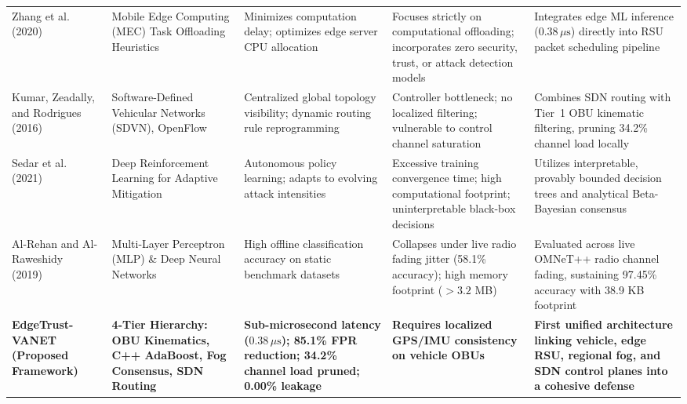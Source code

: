 \documentclass[conference]{IEEEtran}
\begin{document}
\begin{table}[t]
{\begin{tabular}{p{3.2cm}p{3.0cm}p{2.8cm}p{3.4cm}p{4.2cm}}
\addlinespace
Zhang et al.~\cite{fogvanet} (2020) & Mobile Edge Computing (MEC) Task Offloading Heuristics & Minimizes computation delay; optimizes edge server CPU allocation & Focuses strictly on computational offloading; incorporates zero security, trust, or attack detection models & Integrates edge ML inference ($0.38\,\mu\text{s}$) directly into RSU packet scheduling pipeline \\
\addlinespace
Kumar, Zeadally, and Rodrigues~\cite{sdnvanet} (2016) & Software-Defined Vehicular Networks (SDVN), OpenFlow & Centralized global topology visibility; dynamic routing rule reprogramming & Controller bottleneck; no localized filtering; vulnerable to control channel saturation & Combines SDN routing with Tier~1 OBU kinematic filtering, pruning 34.2\% channel load locally \\
\addlinespace
Sedar et al.~\cite{sedar2020reinforcement} (2021) & Deep Reinforcement Learning for Adaptive Mitigation & Autonomous policy learning; adapts to evolving attack intensities & Excessive training convergence time; high computational footprint; uninterpretable black-box decisions & Utilizes interpretable, provably bounded decision trees and analytical Beta-Bayesian consensus \\
\addlinespace
Al-Rehan and Al-Raweshidy~\cite{alrehan2019machine} (2019) & Multi-Layer Perceptron (MLP) \& Deep Neural Networks & High offline classification accuracy on static benchmark datasets & Collapses under live radio fading jitter (58.1\% accuracy); high memory footprint ($>3.2$ MB) & Evaluated across live OMNeT++ radio channel fading, sustaining 97.45\% accuracy with 38.9 KB footprint \\
\addlinespace
\textbf{EdgeTrust-VANET} \newline \textbf{(Proposed Framework)} & \textbf{4-Tier Hierarchy: OBU Kinematics, C++ AdaBoost, Fog Consensus, SDN Routing} & \textbf{Sub-microsecond latency ($0.38\,\mu\text{s}$); 85.1\% FPR reduction; 34.2\% channel load pruned; 0.00\% leakage} & \textbf{Requires localized GPS/IMU consistency on vehicle OBUs} & \textbf{First unified architecture linking vehicle, edge RSU, regional fog, and SDN control planes into a cohesive defense} \\
\bottomrule
\end{tabular}%
}
\end{table}

\end{document}
